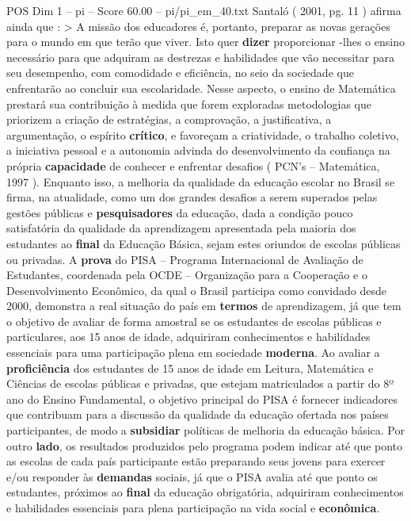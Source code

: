 \begin{textsample}{POS Dim 1 – pi – Score 60.00 – pi/pi\_em\_40.txt}
Santaló ( 2001, pg. 11 ) afirma ainda que : > A missão dos educadores é, portanto, preparar as novas gerações para o mundo em que terão que viver.
Isto quer \textbf{dizer} proporcionar -lhes o ensino necessário para que adquiram as destrezas e habilidades que vão necessitar para seu desempenho, com comodidade e eficiência, no seio da sociedade que enfrentarão ao concluir sua escolaridade.
Nesse aspecto, o ensino de Matemática prestará sua contribuição à medida que forem exploradas metodologias que priorizem a criação de estratégias, a comprovação, a justificativa, a argumentação, o espírito \textbf{crítico}, e favoreçam a criatividade, o trabalho coletivo, a iniciativa pessoal e a autonomia advinda do desenvolvimento da confiança na própria \textbf{capacidade} de conhecer e enfrentar desafios ( PCN’s – Matemática, 1997 ).
Enquanto isso, a melhoria da qualidade da educação escolar no Brasil se firma, na atualidade, como um dos grandes desafios a serem superados pelas gestões públicas e \textbf{pesquisadores} da educação, dada a condição pouco satisfatória da qualidade da aprendizagem apresentada pela maioria dos estudantes ao \textbf{final} da Educação Básica, sejam estes oriundos de escolas públicas ou privadas.
A \textbf{prova} do PISA – Programa Internacional de Avaliação de Estudantes, coordenada pela OCDE – Organização para a Cooperação e o Desenvolvimento Econômico, da qual o Brasil participa como convidado desde 2000, demonstra a real situação do país em \textbf{termos} de aprendizagem, já que tem o objetivo de avaliar de forma amostral se os estudantes de escolas públicas e particulares, aos 15 anos de idade, adquiriram conhecimentos e habilidades essenciais para uma participação plena em sociedade \textbf{moderna}.
Ao avaliar a \textbf{proficiência} dos estudantes de 15 anos de idade em Leitura, Matemática e Ciências de escolas públicas e privadas, que estejam matriculados a partir do 8º ano do Ensino Fundamental, o objetivo principal do PISA é fornecer indicadores que contribuam para a discussão da qualidade da educação ofertada nos países participantes, de modo a \textbf{subsidiar} políticas de melhoria da educação básica.
Por outro \textbf{lado}, os resultados produzidos pelo programa podem indicar até que ponto as escolas de cada país participante estão preparando seus jovens para exercer e/ou responder às \textbf{demandas} sociais, já que o PISA avalia até que ponto os estudantes, próximos ao \textbf{final} da educação obrigatória, adquiriram conhecimentos e habilidades essenciais para plena participação na vida social e \textbf{econômica}.

\end{textsample}

